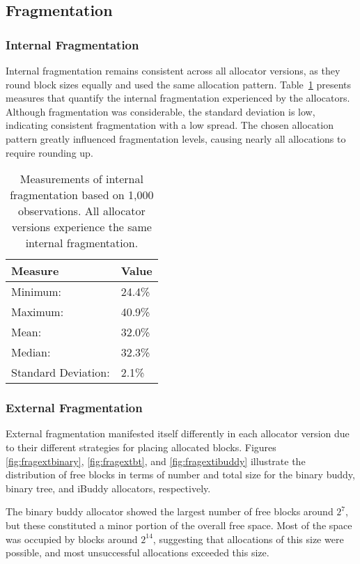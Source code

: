 \FloatBarrier
\subsection{Fragmentation}
\subsubsection{Internal Fragmentation}
Internal fragmentation remains consistent across all allocator versions, as they round block sizes equally and used the same allocation pattern. Table~\ref{table:fraginternal} presents measures that quantify the internal fragmentation experienced by the allocators. Although fragmentation was considerable, the standard deviation is low, indicating consistent fragmentation with a low spread. The chosen allocation pattern greatly influenced fragmentation levels, causing nearly all allocations to require rounding up.

\begin{table}[h]
  \begin{tabular}{|l|l|}
    \hline
    \textbf{Measure}    & \textbf{Value} \\ \hline
    Minimum:            & 24.4\%         \\ \hline
    Maximum:            & 40.9\%         \\ \hline
    Mean:               & 32.0\%         \\ \hline
    Median:             & 32.3\%         \\ \hline
    Standard Deviation: & 2.1\%          \\ \hline
  \end{tabular}
  \centering
  \caption{Measurements of internal fragmentation based on 1,000 observations. All allocator versions experience the same internal fragmentation.}
  \label{table:fraginternal}
\end{table}

\subsubsection{External Fragmentation}
External fragmentation manifested itself differently in each allocator version due to their different strategies for placing allocated blocks. Figures \ref{fig:fragextbinary}, \ref{fig:fragextbt}, and \ref{fig:fragextibuddy} illustrate the distribution of free blocks in terms of number and total size for the binary buddy, binary tree, and iBuddy allocators, respectively.

The binary buddy allocator showed the largest number of free blocks around $2^7$, but these constituted a minor portion of the overall free space. Most of the space was occupied by blocks around $2^{14}$, suggesting that allocations of this size were possible, and most unsuccessful allocations exceeded this size.

